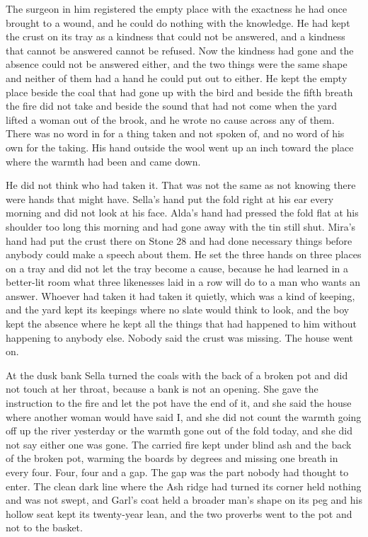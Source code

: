 The surgeon in him registered the empty place with the exactness he had once brought to a wound, and he could do nothing with the knowledge. He had kept the crust on its tray as a kindness that could not be answered, and a kindness that cannot be answered cannot be refused. Now the kindness had gone and the absence could not be answered either, and the two things were the same shape and neither of them had a hand he could put out to either. He kept the empty place beside the coal that had gone up with the bird and beside the fifth breath the fire did not take and beside the sound that had not come when the yard lifted a woman out of the brook, and he wrote no cause across any of them. There was no word in  for a thing taken and not spoken of, and no word of his own for the taking. His hand outside the wool went up an inch toward the place where the warmth had been and came down.

He did not think who had taken it. That was not the same as not knowing there were hands that might have. Sella's hand put the fold right at his ear every morning and did not look at his face. Alda's hand had pressed the fold flat at his shoulder too long this morning and had gone away with the tin still shut. Mira's hand had put the crust there on Stone 28 and had done necessary things before anybody could make a speech about them. He set the three hands on three places on a tray and did not let the tray become a cause, because he had learned in a better-lit room what three likenesses laid in a row will do to a man who wants an answer. Whoever had taken it had taken it quietly, which was a kind of keeping, and the yard kept its keepings where no slate would think to look, and the boy kept the absence where he kept all the things that had happened to him without happening to anybody else. Nobody said the crust was missing. The house went on.

\scenebreak

At the dusk bank Sella turned the coals with the back of a broken pot and did not touch  at her throat, because a bank is not an opening. She gave the instruction to the fire and let the pot have the end of it, and she said the house where another woman would have said I, and she did not count the warmth going off up the river yesterday or the warmth gone out of the fold today, and she did not say either one was gone. The carried fire kept under blind ash and the back of the broken pot, warming the boards by degrees and missing one breath in every four. Four, four and a gap. The gap was the part nobody had thought to enter. The clean dark line where the Ash ridge had turned its corner held nothing and was not swept, and Garl's coat held a broader man's shape on its peg and his hollow seat kept its twenty-year lean, and the two proverbs went to the pot and not to the basket.

